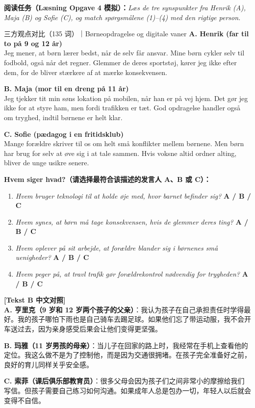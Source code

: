 \textbf{阅读任务（Læsning Opgave 4 模拟）：}\textit{Læs de tre synspunkter fra Henrik (A), Maja (B) og Sofie (C), og match spørgsmålene (1)--(4) med den rigtige person.}

\vspace{0.3em}
\begin{emailbox}{三方观点对比（135 词）｜Børneopdragelse og digitale vaner}
\textbf{A. Henrik (far til to på 9 og 12 år)}\\
Jeg mener, at børn lærer bedst, når de selv får ansvar. Mine børn cykler selv til fodbold, også når det regner. Glemmer de deres sportstøj, kører jeg ikke efter dem, for de bliver stærkere af at mærke konsekvensen.

\vspace{0.3em}
\textbf{B. Maja (mor til en dreng på 11 år)}\\
Jeg tjekker tit min søns lokation på mobilen, når han er på vej hjem. Det gør jeg ikke for at styre ham, men fordi trafikken er tæt. God opdragelse handler også om tryghed, indtil børnene er helt klar.

\vspace{0.3em}
\textbf{C. Sofie (pædagog i en fritidsklub)}\\
Mange forældre skriver til os om helt små konflikter mellem børnene. Men børn har brug for selv at øve sig i at tale sammen. Hvis voksne altid ordner alting, bliver de unge usikre senere.
\end{emailbox}

\vspace{0.25em}
\textbf{Hvem siger hvad?（请选择最符合该描述的发言人 A、B 或 C）：}
\begin{enumerate}
  \item \textit{Hvem bruger teknologi til at holde øje med, hvor barnet befinder sig?} \quad \textbf{A / B / C}
  \item \textit{Hvem synes, at børn må tage konsekvensen, hvis de glemmer deres ting?} \quad \textbf{A / B / C}
  \item \textit{Hvem oplever på sit arbejde, at forældre blander sig i børnenes små uenigheder?} \quad \textbf{A / B / C}
  \item \textit{Hvem peger på, at travl trafik gør forældrekontrol nødvendig for trygheden?} \quad \textbf{A / B / C}
\end{enumerate}

\begin{transbox}
\small
\textbf{\color{NCDTeal}[Tekst B 中文对照]}\\
\textbf{A. 亨里克（9 岁和 12 岁两个孩子的父亲）}：我认为孩子在自己承担责任时学得最好。我的孩子哪怕下雨也是自己骑车去踢足球。如果他们忘了带运动服，我不会开车送过去，因为亲身感受后果会让他们变得更坚强。

\textbf{B. 玛雅（11 岁男孩的母亲）}：当儿子在回家的路上时，我经常在手机上查看他的定位。我这么做不是为了控制他，而是因为交通很拥堵。在孩子完全准备好之前，良好的育儿同样关乎安全感。

\textbf{C. 索菲（课后俱乐部教育员）}：很多父母会因为孩子们之间非常小的摩擦给我们写信。但孩子需要自己练习如何沟通。如果成年人总是包办一切，年轻人以后就会变得不自信。
\end{transbox}

